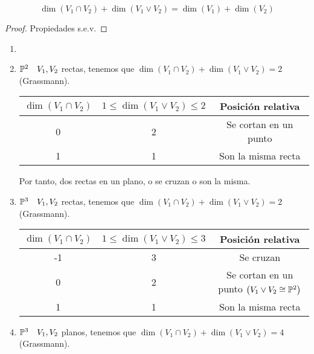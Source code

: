 \begin{prop}
    \[ \dim \left( V_1 \cap V_2 \right) + \dim \left( V_1 \vee V_2 \right) = \dim \left( V_1 \right) + \dim \left( V_2 \right) \]
\end{prop}
\begin{proof}
    Propiedades s.e.v.
\end{proof}
\begin{example}
    \begin{enumerate}
        \item[]
        \item $\mathbb{P}^2 \quad V_1, V_2$ rectas, tenemos que $\dim \left( V_1 \cap V_2 \right) + \dim \left( V_1 \vee V_2 \right) = 2$ (Grassmann).
        \begin{center} \begin{tabular}{|c|c|c|}
            \hline $\dim \left( V_1 \cap V_2 \right)$ & $1 \leq \dim \left( V_1 \vee V_2 \right) \leq 2$  & Posición relativa \\
            \hline \hline
            0 & 2 & Se cortan en un punto \\ \hline
            1 & 1 & Son la misma recta\\ \hline
        \end{tabular} \end{center}
        Por tanto, dos rectas en un plano, o se cruzan o son la misma.
        \item $\mathbb{P}^3 \quad V_1, V_2$ rectas, tenemos que $\dim \left( V_1 \cap V_2 \right) + \dim \left( V_1 \vee V_2 \right) = 2$ (Grassmann).
        \begin{center} \begin{tabular}{|c|c|c|}
            \hline $\dim \left( V_1 \cap V_2 \right)$ & $1 \leq \dim \left( V_1 \vee V_2 \right) \leq 3$  & Posición relativa \\
            \hline \hline
            -1 & 3 & Se cruzan \\ \hline
            0 & 2 & Se cortan en un punto $\left( V_1 \vee V_2 \cong \mathbb{P}^2 \right)$ \\ \hline
            1 & 1 & Son la misma recta\\ \hline
        \end{tabular} \end{center}
        \item $\mathbb{P}^3 \quad V_1, V_2$ planos, tenemos que $\dim \left( V_1 \cap V_2 \right) + \dim \left( V_1 \vee V_2 \right) = 4$ (Grassmann).
        \begin{center} \begin{tabular}{|c|c|c|}

\end{tabular}
\end{center}
\end{enumerate}
\end{example}
